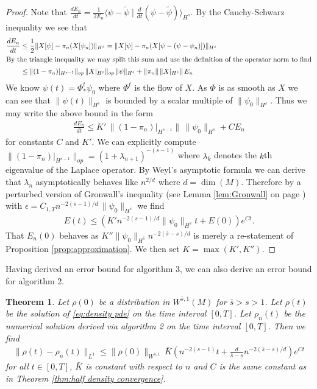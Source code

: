 \documentclass[12pt]{amsart}
\newtheorem{thm}{Theorem}[section]
\begin{document}
\begin{proof}
	Note that $\frac{dE_{n}}{dt} = \frac{1}{2E_{n}} \langle  \psi - \tilde{\psi} \mid \frac{d}{dt} ( \psi -\tilde{\psi} )\rangle_{H^{s}}$.
	By the Cauchy-Schwarz inequality we see that
	\begin{align*}
		\frac{dE_{n}}{dt} &\leq  \frac{1}{2} \| X[\psi] - \pi_{n}(X[\psi_{n}]) \|_{H^{s}} = \| X[\psi] - \pi_{n}( X[\psi- (\psi-\psi_{n})]) \|_{H^{s}} \\
	\intertext{By the triangle inequality we may split this sum and use the definition of the operator norm to find}
		&\leq \| (1-\pi_{n})|_{H^{s-1}} \|_{op} \, \|X|_{H^{s}} \|_{op} \, \| \psi \|_{H^{s}} + \| \pi_{n} \| \, \|X|_{H^{s}} \| \, E_{n} \\
	\end{align*}
	We know $\psi(t) = \Phi^{t}_{*}\psi_{0}$ where $\Phi^{t}$ is the flow of $X$.
	As $\Phi$ is as smooth as $X$ we can see that $\| \psi(t) \|_{H^{s}}$ is bounded by a scalar multiple of $\| \psi_{0} \|_{H^{s}}$.
	Thus we may write the above bound in the form
	\begin{align*}
		\frac{dE_{n}}{dt} \leq K' \, \| (1- \pi_{n})|_{H^{s-1}} \| \, \| \psi_{0}\|_{H^{s}}+ C E_{n}
	\end{align*}
	for constants $C$ and $K'$.
	We can explicitly compute $\| (1-\pi_{n})|_{H^{s-1}} \|_{op} = (1+\lambda_{n+1})^{-(s-1)}$ where $\lambda_{k}$ denotes the $k$th eigenvalue of the Laplace operator.
	By Weyl's asymptotic formula \cite[Theorem B.2]{Chavel1984} we
	can derive that $\lambda_{n}$ asymptotically behaves like $n^{2/d}$ where $d = \dim(M)$.
	Therefore by a perturbed version of Gronwall's inequality (see Lemma \ref{lem:Gronwall} on page \pageref{lem:Gronwall}) with $\epsilon = C_{1,T} n^{-2(s-1) / d} \, \| \psi_{0}\|_{H^{s}}$
	we find
	\begin{align*}
		E(t) \leq ( K' n^{-2(s-1) / d} \| \psi_{0} \|_{H^{s}} t+  E(0) ) e^{C t}.
	\end{align*}
	That $E_{n}(0)$ behaves as $K'' \| \psi_{0} \|_{H^{\bar{s}}} n^{-2(\bar{s}-s)/d}$ is merely a re-statement of Proposition \ref{prop:approximation}.
	We then set $K = \max(K', K'')$.
\end{proof}

Having derived an error bound for algorithm 3, we can also derive an error bound for algorithm 2.

\begin{thm} \label{thm:density convergence}
	Let $\rho(0)$ be a distribution in $W^{\bar{s},1}(M)$ for $\bar{s} > s >1$.
	Let $\rho(t)$ be the solution of \eqref{eq:density pde} on the time interval $[0,T]$.
	Let $\rho_{n}(t)$ be the numerical solution derived via algorithm 2 on the time interval $[0,T]$.
	Then we find
	\begin{align*}
		\| \rho(t) - \rho_{n}(t) \|_{L^{1}} \leq \| \rho(0) \|_{W^{\bar{s},1}} \, \bar{K} \left( n^{-2(s-1)} t+  \frac{d}{\bar{s}-s} n^{-2(\bar{s}-s)/d} \right) e^{C t}
	\end{align*}
	for all $t \in [0,T]$, $\bar{K}$ is constant with respect to $n$ and $C$ is the same constant as in Theorem \ref{thm:half density convergence}.
\end{thm}
\end{document}
